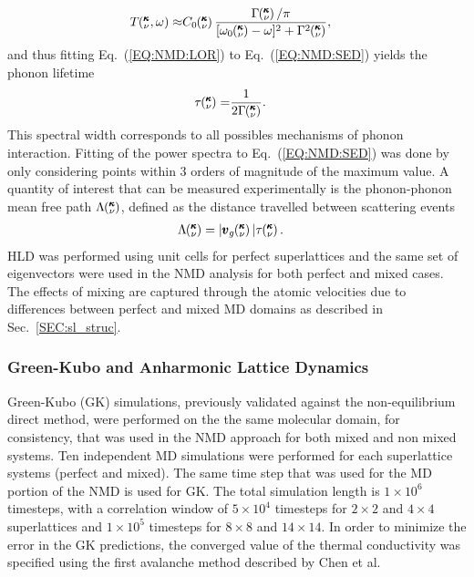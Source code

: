 \begin{equation}\label{EQ:NMD:LOR}
\begin{split}
T\kvw\approx&C_0\kv\frac{\Gamma\kv/\pi}{[\omega_0\kv-\omega]^2+\Gamma^2\kv},
\end{split}
\end{equation}
and thus fitting Eq.~(\ref{EQ:NMD:LOR}) to Eq.~(\ref{EQ:NMD:SED}) yields the phonon lifetime
\begin{equation}\label{EQ:lifetime}
\begin{split}
\tau\mspace{-4.0mu}\left(\mspace{-8.0mu} \begin{smallmatrix}&\pmb{\kappa} \\&\nu\end{smallmatrix} \mspace{-3.0mu}\right)=&\frac{1}{2\Gamma\mspace{-4.0mu}\left(\mspace{-8.0mu} \begin{smallmatrix}&\pmb{\kappa} \\&\nu\end{smallmatrix} \mspace{-3.0mu}\right)}.
\end{split}
\end{equation}
This spectral width corresponds to all possibles mechanisms of phonon interaction. Fitting of the power spectra to Eq.~(\ref{EQ:NMD:SED}) was done by only considering points within 3 orders of magnitude of the maximum value. A quantity of interest that can be measured experimentally \cite{Jon} is the phonon-phonon mean free path $\Lambda\mspace{-4.0mu}\left(\mspace{-8.0mu} \begin{smallmatrix}&\pmb{\kappa} \\&\nu\end{smallmatrix} \mspace{-3.0mu}\right)$, defined as the distance travelled between scattering events \cite{ziman_electrons_2001}
\begin{equation}\label{EQ:M:phonon_mfp}
\begin{split}
\Lambda\kv &= |\pmb{v}_{g}\kv {}| \tau\kv.
\end{split}
\end{equation}
HLD was performed using unit cells for perfect superlattices and the same set of eigenvectors were used in the NMD analysis for both perfect and mixed cases. The effects of mixing are captured through the atomic velocities due to differences between perfect and mixed MD domains as described in Sec.~\ref{SEC:sl_struc}.

\subsubsection{Green-Kubo and Anharmonic Lattice Dynamics}
Green-Kubo (GK) simulations, previously validated against the non-equilibrium direct method,\cite {PhysRevB.79.075316} were performed on the the same molecular domain, for consistency, that was used in the NMD approach for both mixed and non mixed systems. Ten independent MD simulations were performed for each superlattice systems (perfect and mixed). The same time step that was used for the MD portion of the NMD is used for GK. The total  simulation length is $1\times 10^6$ timesteps, with a correlation window of $5\times 10^4$ timesteps for $2 \times 2$ and $4 \times 4$ superlattices and $1\times 10^5$ timesteps for $8 \times 8$ and $14 \times 14$. In order to minimize the error in the GK predictions, the converged value of the thermal conductivity was specified using the first avalanche method described by Chen et al. \cite{Chen20102392}

